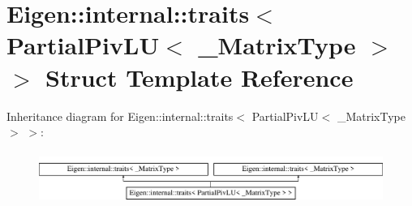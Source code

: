 \hypertarget{struct_eigen_1_1internal_1_1traits_3_01_partial_piv_l_u_3_01___matrix_type_01_4_01_4}{}\section{Eigen\+:\+:internal\+:\+:traits$<$ Partial\+Piv\+LU$<$ \+\_\+\+Matrix\+Type $>$ $>$ Struct Template Reference}
\label{struct_eigen_1_1internal_1_1traits_3_01_partial_piv_l_u_3_01___matrix_type_01_4_01_4}
Inheritance diagram for Eigen\+:\+:internal\+:\+:traits$<$ Partial\+Piv\+LU$<$ \+\_\+\+Matrix\+Type $>$ $>$\+:\begin{figure}[H]
\begin{center}
\leavevmode
\includegraphics[height=1.750000cm]{struct_eigen_1_1internal_1_1traits_3_01_partial_piv_l_u_3_01___matrix_type_01_4_01_4}
\end{center}
\end{figure}
